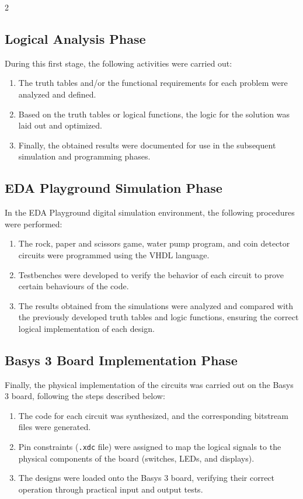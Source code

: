 \documentclass{article}
\begin{document}
\begin{multicols}{2}
\subsection{Logical Analysis Phase}
During this first stage, the following activities were carried out:
\begin{enumerate}
    \item The truth tables and/or the functional requirements for each problem were analyzed and defined.
    \item Based on the truth tables or logical functions, the logic for the solution was laid out and optimized.
    \item Finally, the obtained results were documented for use in the subsequent simulation and programming phases.
\end{enumerate}

\subsection{EDA Playground Simulation Phase}
In the EDA Playground digital simulation environment, the following procedures were performed:
\begin{enumerate}
    \item The rock, paper and scissors game, water pump program, and coin detector circuits were programmed using the VHDL language.
    \item Testbenches were developed to verify the behavior of each circuit to prove certain behaviours of the code.
    \item The results obtained from the simulations were analyzed and compared with the previously developed truth tables and logic functions, ensuring the correct logical implementation of each design.
\end{enumerate}

\subsection{Basys 3 Board Implementation Phase}
Finally, the physical implementation of the circuits was carried out on the Basys 3 board, following the steps described below:
\begin{enumerate}
    \item The code for each circuit was synthesized, and the corresponding bitstream files were generated.
    \item Pin constraints (\texttt{.xdc} file) were assigned to map the logical signals to the physical components of the board (switches, LEDs, and displays).
    \item The designs were loaded onto the Basys 3 board, verifying their correct operation through practical input and output tests.
\end{enumerate}


\end{multicols}
\end{document}
